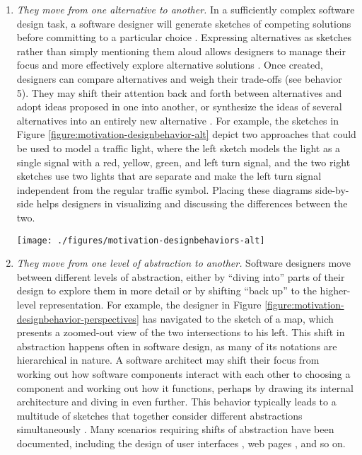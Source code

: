 \documentclass[12pt,fleqn]{ucithesis}
\begin{document}
\begin{enumerate}
 \item \emph{They move from one alternative to another.} In a sufficiently complex software design task, a software designer will generate sketches of competing solutions before committing to a particular choice \cite{zannier2007comparing}. Expressing alternatives as sketches rather than simply mentioning them aloud allows designers to manage their focus and more effectively explore alternative solutions \cite{myers2008designers}. Once created, designers can compare alternatives and weigh their trade-offs \cite{buxton2010sketching} (see behavior 5). They may shift their attention back and forth between alternatives and adopt ideas proposed in one into another, or synthesize the ideas of several alternatives into an entirely new alternative \cite{jones1992design}. For example, the sketches in Figure \ref{figure:motivation-designbehavior-alt} depict two approaches that could be used to model a traffic light, where the left sketch models the light as a single signal with a red, yellow, green, and left turn signal, and the two right sketches use two lights that are separate and make the left turn signal independent from the regular traffic symbol. Placing these diagrams side-by-side helps designers in visualizing and discussing the differences between the two. 

\begin{figure*}[tbh]
  \centering
  \texttt{[image: ./figures/motivation-designbehaviors-alt]}
  \caption{Two diagrams that designers used to discuss alternative approaches for modeling a traffic light.}
  \label{figure:motivation-designbehavior-alt}
\end{figure*}   

 \item \emph{They move from one level of abstraction to another.} Software designers move between different levels of abstraction, either by ``diving into'' parts of their design to explore them in more detail or by shifting ``back up'' to the higher-level representation. For example, the designer in Figure \ref{figure:motivation-designbehavior-perspectives} has navigated to the sketch of a map, which presents a zoomed-out view of the two intersections to his left. This shift in abstraction happens often in software design, as many of its notations are hierarchical in nature. A software architect may shift their focus from working out how software components interact with each other to choosing a component and working out how it functions, perhaps by drawing its internal architecture and diving in even further. This behavior typically leads to a multitude of sketches that together consider different abstractions simultaneously \cite{petre2009insights}. Many scenarios requiring shifts of abstraction have been documented, including the design of user interfaces \cite{da2001user}, web pages \cite{van2003design}, and so on.


\end{enumerate}
\end{document}
